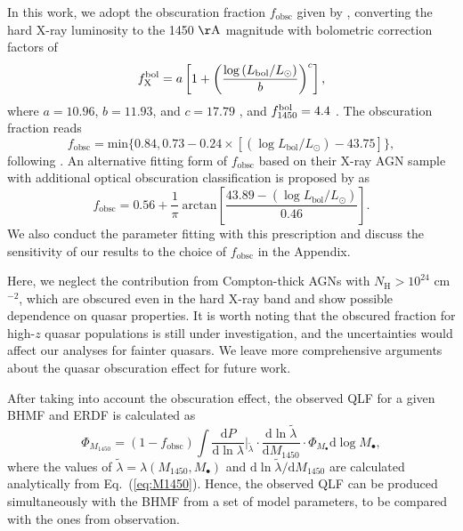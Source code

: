 \documentclass[twocolumn, twocolappendix]{aastex63}
\newcommand{\Mbh}{M_\bullet}
\newcommand{\fobsc}{f_\mathrm{obsc}}
\newcommand{\Muv}{M_{1450}}
\newcommand{\Lbol}{L_\mathrm{bol}}
\newcommand{\D}{\mathrm{d}}
\begin{document}
\begin{CJK*}{UTF8}{gbsn}
In this work, we adopt the obscuration fraction $\fobsc$ given by \citet{2014ApJ...786..104U}, 
converting the hard X-ray luminosity to the 1450 $\mathrm{\AA}$ magnitude with bolometric correction factors of
\begin{equation*}
  f^{\rm bol}_{\rm X} =
  a\left[1+\left(\frac{\log \left(\Lbol / L_\odot\right)}{b}\right)^{c}\right],
\end{equation*}
where $a=10.96$, $b = 11.93$, and $c = 17.79$ \citep[Eq.~2 in ][]{2020A&A...636A..73D}, 
and $f^{\rm bol}_{1450}=4.4$ \citep{2006ApJS..166..470R}.
The obscuration fraction reads 
\begin{equation*}
  \fobsc = \text{min}\lbrace  0.84 , 0.73-0.24\times[ (\log \Lbol/L_\odot) -43.75] \rbrace,
\end{equation*}
following \citet{2014ApJ...786..104U}.
An alternative fitting form of $\fobsc$ based on their X-ray AGN sample with additional optical obscuration classification 
is proposed by \citet{2014MNRAS.437.3550M} as
%
\begin{equation*}
  \fobsc = 0.56 + \frac{1}{\pi}~ \text{arctan} \left[ \frac{43.89 - (\log \Lbol/L_\odot)}{0.46}\right].
\end{equation*}
%
We also conduct the parameter fitting with this prescription and discuss the sensitivity of our results to 
the choice of $\fobsc$ in the Appendix.


Here, we neglect the contribution from Compton-thick AGNs with $N_\mathrm{H}>10^{24}$ cm$^{-2}$, 
which are obscured even in the hard X-ray band and show possible dependence on quasar properties.
It is worth noting that the obscured fraction for high-$z$ quasar populations is still under investigation,
and the uncertainties would affect our analyses for fainter quasars.
We leave more comprehensive arguments about the quasar obscuration effect for future work.

After taking into account the obscuration effect, 
the observed QLF for a given BHMF and ERDF is calculated as
\begin{equation}
\label{eq:dn_dM1450}
\Phi_{\Muv} 
 = (1 -\fobsc)  %
\int \frac{\D P}{\D \ln \lambda}\Big|_{\tilde{\lambda}}  \cdot
\frac{\D \ln \tilde{\lambda}}{\D \Muv} \cdot
 \Phi_{\Mbh} \D \log \Mbh,
\end{equation}
%
where the values of $\tilde{\lambda}=\lambda(\Muv, \Mbh)$ and $\D \ln \tilde{\lambda}/\D \Muv$ are calculated analytically from Eq.~(\ref{eq:M1450}).
%
Hence, the observed QLF can be produced simultaneously with the BHMF from a set of model parameters, 
to be compared with the ones from observation.





\end{CJK*}
\end{document}
